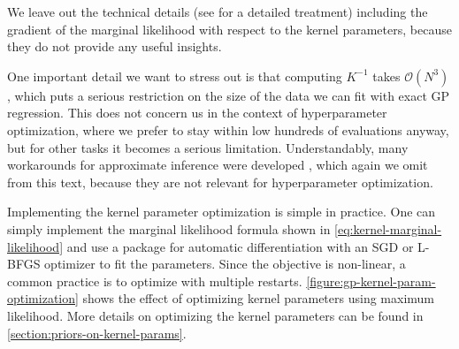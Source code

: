 We leave out the technical details (see \cite{williams2006gaussian} for
a detailed treatment) including the gradient of the marginal likelihood with respect to the
kernel parameters, because they do not provide any useful insights.

One important detail we want to stress out is that computing $K^{-1}$ takes
$\mathcal{O}(N^3)$, which puts a serious restriction on the size of the data we can fit
with exact GP regression. This does not concern us in the context of
hyperparameter optimization, where we prefer to stay within low hundreds of
evaluations anyway, but for other tasks it becomes a serious limitation.
Understandably, many workarounds for approximate inference were developed
\citep{williams2006gaussian}, which again we omit from this text, because they
are not relevant for hyperparameter optimization.

Implementing the kernel parameter optimization is simple in practice. One can
simply implement the marginal likelihood formula shown in
\autoref{eq:kernel-marginal-likelihood} and
use a package for automatic differentiation with an SGD or L-BFGS optimizer
to fit the parameters. Since the objective is non-linear, a common
practice \citep{gpy2014} is to optimize with multiple restarts.
\autoref{figure:gp-kernel-param-optimization} shows the effect of optimizing
kernel parameters using maximum likelihood. More details on optimizing the kernel
parameters can be found in \autoref{section:priors-on-kernel-params}.
